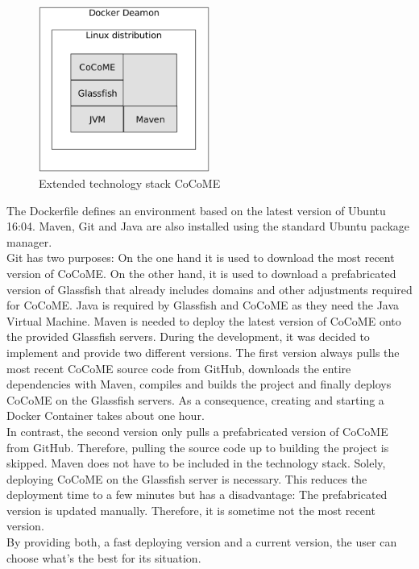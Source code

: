 	\begin{figure}[!h]
		\centering
		\includegraphics[width = 0.5\textwidth]{img/tech_stack_CoCoME.png}
		\caption{Extended technology stack CoCoME}
		\label{techStack}
	\end{figure}
\noindent	
The Dockerfile defines an environment based on the latest version of Ubuntu 16:04. Maven, Git and Java are also installed using the standard Ubuntu package manager.\\
Git has two purposes: On the one hand it is used to download the most recent version of CoCoME.	On the other hand, it is used to download a prefabricated version of Glassfish that already includes domains and other adjustments required for CoCoME. Java is required by Glassfish and CoCoME as they need the Java Virtual Machine. Maven is needed to deploy the latest version of CoCoME onto the provided Glassfish servers.
\noindent
During the development, it was decided to implement and provide two different versions. The first version always pulls the most recent CoCoME source code from GitHub, downloads the entire dependencies with Maven, compiles and builds the project and finally deploys CoCoME on the Glassfish servers. As a consequence, creating and starting a Docker Container takes about one hour.\\
In contrast, the second version only pulls a prefabricated version of CoCoME from GitHub. 
Therefore, pulling the source code up to building the project is skipped. Maven does not have to be included in the technology stack. Solely, deploying CoCoME on the Glassfish server is necessary.
This reduces the deployment time to a few minutes but has a disadvantage: The prefabricated version is updated manually. Therefore, it is sometime not the most recent version.\\
By providing both, a fast deploying version and a current version, the user can choose what's the best for its situation.
	

